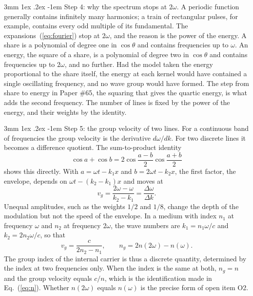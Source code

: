 \documentclass[%
 reprint, amsmath,amssymb, aps, prb, ]{revtex4-2}
\makeatletter
\numberwithin{equation}{section}
\renewcommand\paragraph{%
  \@startsection{paragraph}{4}{\z@}%
    {3mm \@plus 1ex \@minus .2ex}%
    {-1em}%
    {\normalfont\normalsize\itshape}}
\makeatother
\begin{document}
\paragraph{Step 4: why the spectrum stops at $2\omega$.} A periodic function generally contains infinitely many harmonics; a train of rectangular pulses, for example, contains every odd multiple of its fundamental. The expansions~(\ref{eq:fourier}) stop at $2\omega$, and the reason is the power of the energy. A share is a polynomial of degree one in $\cos\theta$ and contains frequencies up to $\omega$. An energy, the square of a share, is a polynomial of degree two in $\cos\theta$ and contains frequencies up to $2\omega$, and no further. Had the model taken the energy proportional to the share itself, the energy at each kernel would have contained a single oscillating frequency, and no wave group would have formed. The step from share to energy in Paper \#65, the squaring that gives the quartic energy, is what adds the second frequency. The number of lines is fixed by the power of the energy, and their weights by the identity.

\paragraph{Step 5: the group velocity of two lines.} For a continuous band of frequencies the group velocity is the derivative $d\omega/dk$. For two discrete lines it becomes a difference quotient. The sum-to-product identity
\begin{equation}
\cos a + \cos b = 2\cos\frac{a - b}{2}\cos\frac{a + b}{2}
\label{eq:sumtoproduct}
\end{equation}
shows this directly. With $a = \omega t - k_1x$ and $b = 2\omega t - k_2x$, the first factor, the envelope, depends on $\omega t - (k_2 - k_1)x$ and moves at
\begin{equation}
v_g = \frac{2\omega - \omega}{k_2 - k_1} = \frac{\Delta\omega}{\Delta k}.
\label{eq:vgdiscrete}
\end{equation}
Unequal amplitudes, such as the weights $1/2$ and $1/8$, change the depth of the modulation but not the speed of the envelope. In a medium with index $n_1$ at frequency $\omega$ and $n_2$ at frequency $2\omega$, the wave numbers are $k_1 = n_1\omega/c$ and $k_2 = 2n_2\omega/c$, so that
\begin{equation}
v_g = \frac{c}{2n_2 - n_1}, \qquad n_g = 2n(2\omega) - n(\omega).
\label{eq:ngdiscrete}
\end{equation}
The group index of the internal carrier is thus a discrete quantity, determined by the index at two frequencies only. When the index is the same at both, $n_g = n$ and the group velocity equals $c/n$, which is the identification made in Eq.~(\ref{eq:n}). Whether $n(2\omega)$ equals $n(\omega)$ is the precise form of open item O2.
\end{document}
